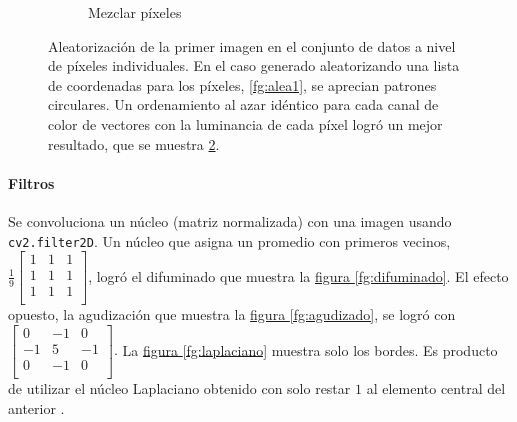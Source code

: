 \documentclass{article}
\begin{document}
\begin{figure}
\begin{subfigure}[b]{0.24\textwidth}
		\caption{Mezclar píxeles}
		\label{fg:alea2}
	\end{subfigure}
	\caption{Aleatorización de la primer imagen en el conjunto de datos a nivel de píxeles individuales. En el caso generado aleatorizando una lista de coordenadas para los píxeles, \hyperref[fg:alea1]{\ref*{fg:alea1}}, se aprecian patrones circulares. Un ordenamiento al azar idéntico para cada canal de color de vectores con la luminancia de cada píxel logró un mejor resultado, que se muestra \hyperref[fg:alea2]{\ref*{fg:alea2}}.
	}
\end{figure}


\paragraph{Filtros} 
Se convoluciona un núcleo (matriz normalizada) con una imagen usando \verb'cv2.filter2D'.
Un núcleo que asigna un promedio con primeros vecinos, \(
\frac{1}{9} \left[ {\begin{array}{ccc}
	1 & 1 & 1 \\
	1 & 1 & 1 \\
	1 & 1 & 1 \\
\end{array} } \right]
\), logró el difuminado que muestra la \hyperref[fg:difuminado]{figura \ref*{fg:difuminado}}.
El efecto opuesto, la agudización que muestra la \hyperref[fg:agudizado]{figura \ref*{fg:agudizado}}, se logró con \(
\left[ {\begin{array}{ccc}
	0 & -1 & 0 \\
	-1 & 5 & -1 \\
	0 & -1 & 0 \\
\end{array} } \right].
\)
La \hyperref[fg:laplaciano]{figura \ref*{fg:laplaciano}} muestra solo los bordes.
Es producto de utilizar el núcleo Laplaciano obtenido con solo restar $1$ al elemento central del anterior \cite{noauthor_opencv_nodate-1}.
\end{document}
